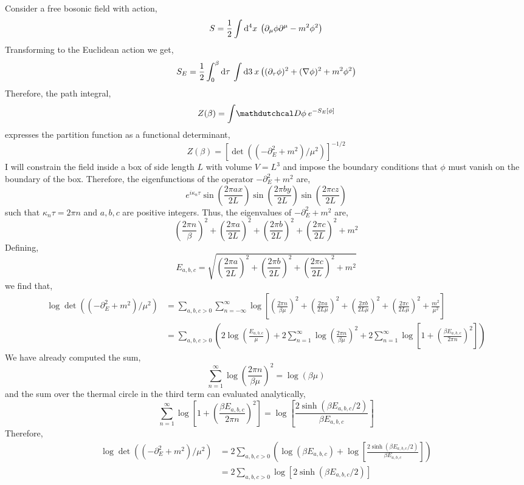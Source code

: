 \documentclass[12pt]{article}
\begin{document}
Consider a free bosonic field with action,
\[ S = \frac{1}{2} \int \mathrm{d}^{4} x \: \left( \partial_\mu \phi \partial^\mu - m^2 \phi^2 \right) \]
Transforming to the Euclidean action we get,
\[ S_E = \frac{1}{2} \int_0^\beta \mathrm{d}\tau \: \int \mathrm{d}3 \:{x} \left( (\partial_{\tau} \phi)^2 + (\nabla \phi)^2 + m^2 \phi^2 \right) \] 
Therefore, the path integral,
\[ Z(\beta) = \int \pathd{\phi} e^{- S_E[\phi] } \]
expresses the partition function as a functional determinant,
\[ Z(\beta) = \left[ \det{\left((- \partial^2_E + m^2)/\mu^2 \right)} \right]^{-1/2} \]
I will constrain the field inside a box of side length $L$ with volume $V = L^3$ and impose the boundary conditions that $\phi$ must vanish on the boundary of the box. Therefore, the eigenfunctions of the operator $- \partial^2_E + m^2$ are,
\[ e^{i \kappa_n \tau} \sin{\left( \frac{2\pi a x}{2L} \right)} \sin{\left( \frac{2\pi b y}{2L} \right)} \sin{\left( \frac{2\pi c z}{2L} \right)}  \]
such that $\kappa_n \tau = 2 \pi n$ and $a,b,c$ are positive integers. Thus, the eigenvalues of $- \partial^2_E + m^2$ are,
\[ \left( \frac{2 \pi n}{\beta} \right)^2 + \left( \frac{2\pi a}{2L} \right)^2  + \left( \frac{2\pi b}{2L} \right)^2  + \left( \frac{2\pi c}{2L} \right)^2  + m^2 \]
Defining,
\[ E_{a,b,c} = \sqrt{ \left( \frac{2\pi a}{2L} \right)^2  + \left( \frac{2\pi b}{2L} \right)^2  + \left( \frac{2\pi c}{2L} \right)^2  + m^2 } \]
we find that,
\begin{align*}
\log{\det{\left((- \partial^2_E + m^2)/\mu^2 \right)}} & = \sum_{a,b,c > 0} \sum_{n = -\infty}^\infty \log{\left[ \left( \frac{2 \pi n}{\beta \mu} \right)^2 + \left( \frac{2\pi a}{2L\mu} \right)^2  + \left( \frac{2 \pi b}{2L\mu} \right)^2  + \left( \frac{2\pi c}{2L\mu} \right)^2  + \frac{m^2}{\mu^2} \right]}
\\
& = \sum_{a,b,c > 0} \left( 2 \log{\left( \frac{E_{a,b,c}}{\mu} \right)} + 2 \sum_{n = 1}^\infty \log{\left( \frac{2 \pi n}{\beta\mu} \right)^2} + 2 \sum_{n = 1}^\infty \log{\left[ 1 + \left( \frac{ \beta E_{a,b,c} }{2 \pi n} \right)^2 \right]}  \right)
\end{align*}
We have already computed the sum,
\[ \sum_{n = 1}^\infty \log{\left( \frac{2 \pi n}{\beta \mu} \right)^2} = \log{(\beta \mu)} \]
and the sum over the thermal circle in the third term can evaluated analytically,
\[ \sum_{n = 1}^\infty \log{\left[ 1 + \left( \frac{ \beta E_{a,b,c} }{2 \pi n} \right)^2 \right]} = \log{\left[ \frac{2 \sinh{(\beta E_{a,b,c}/2)}}{\beta E_{a,b,c}} \right]} \]
Therefore, 
\begin{align*}
\log{\det{\left((- \partial^2_E + m^2)/\mu^2 \right)}} & = 
2 \sum_{a,b,c > 0} \left( \log{(\beta E_{a,b,c})} + \log{\left[ \frac{2 \sinh{(\beta E_{a,b,c}/2)}}{\beta E_{a,b,c}} \right]}  \right) 
\\
& = 2 \sum_{a,b,c > 0} \log{\left[ 2 \sinh{(\beta E_{a,b,c}/2)} \right]}
\end{align*}
\end{document}
